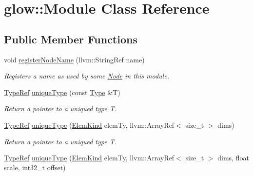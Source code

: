 \hypertarget{classglow_1_1_module}{}\section{glow\+:\+:Module Class Reference}
\label{classglow_1_1_module}
\subsection*{Public Member Functions}
\begin{DoxyCompactItemize}
\item 
\mbox{\label{classglow_1_1_module_a33a4f2f2f6f4a4c1b32f7b1e07990fa9}} 
void \hyperlink{classglow_1_1_module_a33a4f2f2f6f4a4c1b32f7b1e07990fa9}{register\+Node\+Name} (llvm\+::\+String\+Ref name)
\begin{DoxyCompactList}\small\item\em Registers a name as used by some \hyperlink{classglow_1_1_node}{Node} in this module. \end{DoxyCompactList}\item 
\mbox{\label{classglow_1_1_module_ac96d5731fdf045e1252222de8dfc0480}} 
\hyperlink{structglow_1_1_type}{Type\+Ref} \hyperlink{classglow_1_1_module_ac96d5731fdf045e1252222de8dfc0480}{unique\+Type} (const \hyperlink{structglow_1_1_type}{Type} \&T)
\begin{DoxyCompactList}\small\item\em Return a pointer to a uniqued type {\ttfamily T}. \end{DoxyCompactList}\item 
\mbox{\label{classglow_1_1_module_a7963c216efadb6473cb992b15ac46f64}} 
\hyperlink{structglow_1_1_type}{Type\+Ref} \hyperlink{classglow_1_1_module_a7963c216efadb6473cb992b15ac46f64}{unique\+Type} (\hyperlink{namespaceglow_ab92e14a94329daf4083db670e95fbcdf}{Elem\+Kind} elem\+Ty, llvm\+::\+Array\+Ref$<$ size\+\_\+t $>$ dims)
\begin{DoxyCompactList}\small\item\em Return a pointer to a uniqued type {\ttfamily T}. \end{DoxyCompactList}\item 
\mbox{\label{classglow_1_1_module_ad05154013ddf0b91c4948018db8e47b9}} 
\hyperlink{structglow_1_1_type}{Type\+Ref} \hyperlink{classglow_1_1_module_ad05154013ddf0b91c4948018db8e47b9}{unique\+Type} (\hyperlink{namespaceglow_ab92e14a94329daf4083db670e95fbcdf}{Elem\+Kind} elem\+Ty, llvm\+::\+Array\+Ref$<$ size\+\_\+t $>$ dims, float scale, int32\+\_\+t offset)

\end{DoxyCompactItemize}
